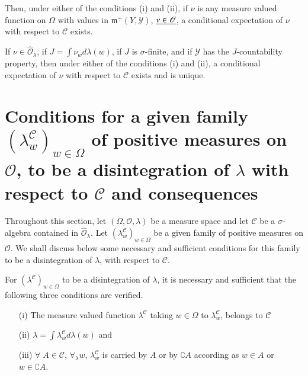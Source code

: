 Then, under either of the conditions (i) and (ii), if $\nu$ is any
measure valued function on $\Omega$ with values in $\mathfrak{m}^+
(Y, \mathscr{Y})$, $\underline{\nu \in \mathscr{O}}$, a conditional
expectation of $\nu$ with respect to $\mathscr{C}$ exists. 

If $\nu \in \hat{\mathscr{O}}_\lambda$, if $J = \int\nu_w d \lambda
(w)$, if $J$ is $\sigma$-finite, and if $\mathscr{Y}$ has the
$J$-countability property, then under either of the conditions (i) and
(ii), a conditional expectation of $\nu$ with respect to $\mathscr{C}$
exists and is unique. 

\section[Conditions for a given family...]{Conditions for a given family $(\lambda^\mathscr{C}_w)_{w \in
  \Omega}$ of positive measures on $\mathscr{O}$, to be a
  disintegration of $\lambda$ with respect to $\mathscr{C}$ and
  consequences}\label{part1:chap3:sec7}

Throughout this section, let $(\Omega, \mathscr{O}, \lambda)$ be a
measure space and let $\mathscr{C}$ be a $\sigma$-algebra contained in
$\hat{\mathscr{O}}_\lambda$. Let $(\lambda^\mathscr{C}_w)_{w \in
  \Omega}$ be a given family of positive measures on $\mathscr{O}$. We
shall discuss below some necessary and sufficient conditions for this
family to be a disintegration of $\lambda$, with respect to
$\mathscr{C}$. 

\begin{proposition}\label{part1:chap3:prop49}
For $(\lambda^\mathscr{C})_{w \in\Omega}$ to be a disintegration of
$\lambda$, it is necessary and sufficient that the following three
conditions are verified.
\begin{itemize}
\item[{\rm (i)}] The measure valued function $\lambda^\mathscr{C} $
  taking $w \in\Omega$ to $\lambda^\mathscr{C}_w$, belongs to
  $\mathscr{C}$ 

\item[{\rm (ii)}] $\lambda = \int \lambda^\mathscr{C}_w
  d\lambda(w)$ \qquad and 

\item[{\rm (iii)}] $\forall \; A \in \mathscr{C}$, $\forall_\lambda
  w$, $\lambda^\mathscr{C}_w$ is carried by $A$ or by $\complement A$
  according as $w \in A$ or $w \in\complement A$. 
\end{itemize}
\end{proposition}

